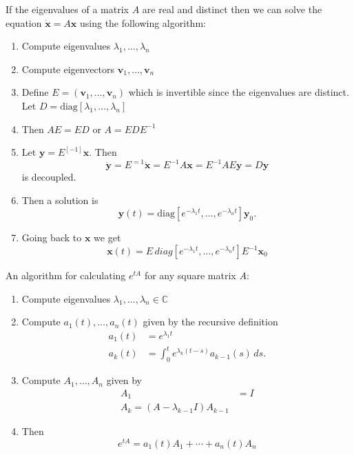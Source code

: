 \documentclass{article}
\newcommand{\C}{\mathbb{C}}
\begin{document}
    If the eigenvalues of a matrix $A$ are real and distinct then we can solve the equation $\dot{\mathbf{x}}=A\mathbf{x}$ using the following algorithm:
    \begin{enumerate}
        \item Compute eigenvalues $\lambda_1,\dots,\lambda_n$
        \item Compute eigenvectors $\mathbf{v}_1,\dots,\mathbf{v}_n$
        \item Define $E=(\mathbf{v}_1,\dots,\mathbf{v}_n)$ which is invertible since the eigenvalues are distinct. Let $D=\text{diag}\left[\lambda_1,\dots,\lambda_n\right]$
        \item Then $AE=ED$ or $A=EDE^{-1}$
        \item Let $\mathbf{y}=E^[-1]\mathbf{x}$. Then
            $$
            \dot{\mathbf{y}}=E^{=1}\dot{\mathbf{x}}=E^{-1}A\mathbf{x}=E^{-1}AE\mathbf{y}=D\mathbf{y}
            $$
            is decoupled.
        \item Then a solution is
            $$
                \mathbf{y}(t)=\text{diag}\left[e^{-\lambda_1 t},\dots, e^{-\lambda_n t}\right]\mathbf{y}_0.
            $$
        \item Going back to $\mathbf{x}$ we get
            $$
                \mathbf{x}(t)=E\,{diag}\left[e^{-\lambda_1 t},\dots, e^{-\lambda_n t}\right]E^{-1}\mathbf{x}_0
            $$
    \end{enumerate}
    
    
    An algorithm for calculating $e^{tA}$ for any square matrix $A$:
    \begin{enumerate}
        \item Compute eigenvalues $\lambda_1,\dots,\lambda_n\in\C$
        \item Compute $a_1(t),\dots,a_n(t)$ given by the recursive definition
            \begin{align*}
                a_1(t)&=e^{\lambda_1 t}\\ 
                a_k(t)&=\int_0^t e^{\lambda_k(t-s)}a_{k-1}(s)\, ds.          
            \end{align*}
        \item Compute $A_1,\dots,A_n$ given by
        \begin{align*}
            A_1&=I\\
            A_k = (A-\lambda_{k-1}I)A_{k-1}
        \end{align*}
        \item Then 
            $$
                e^{tA} = a_1(t)A_1+\cdots+a_n(t)A_n
            $$
    \end{enumerate}

    
\end{document}
